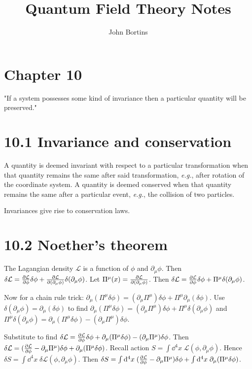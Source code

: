 \documentclass{article}
\title{Quantum Field Theory Notes}
\author{John Bortins}
\begin{document}
\maketitle{}

\section*{Chapter 10}
"If a system possesses some kind of invariance then a particular quantity will be preserved."

\section*{10.1 Invariance and conservation}
A quantity is deemed invariant with respect to a particular transformation when that quantity remains the same after said transformation, \emph{e.g.}, after rotation of the coordinate system. A quantity is deemed conserved when that quantity remains the same after a particular event, \emph{e.g.}, the collision of two particles.

Invariances give rise to conservation laws.

\section*{10.2 Noether's theorem}
The Lagangian density $\mathcal{L}$ is a function of $\phi$ and $\partial_\mu \phi$. Then $\delta\mathcal{L}=\pdv{\mathcal{L}}{\phi}\delta\phi+\pdv{\mathcal{L}}{(\partial_\mu \phi)}\delta(\partial_\mu \phi)$. Let $\Pi^\mu (x)=\pdv{\mathcal{L}}{(\partial_\mu \phi)}$. Then $\delta\mathcal{L}=\pdv{\mathcal{L}}{\phi}\delta\phi+\Pi^\mu \delta(\partial_\mu \phi)$.

Now for a chain rule trick: $\partial_\mu(\Pi^\mu \delta\phi)=(\partial_\mu \Pi^\mu)\delta\phi+\Pi^\mu \partial_\mu (\delta\phi)$. Use $\delta(\partial_\mu \phi)=\partial_\mu ( \delta\phi)$ to find $\partial_\mu(\Pi^\mu \delta\phi)=(\partial_\mu \Pi^\mu)\delta\phi+\Pi^\mu \delta(\partial_\mu \phi)$ and $\Pi^\mu \delta(\partial_\mu \phi)=\partial_\mu(\Pi^\mu \delta\phi)-(\partial_\mu \Pi^\mu)\delta\phi$.

Substitute to find $\delta\mathcal{L}=\pdv{\mathcal{L}}{\phi}\delta\phi+\partial_\mu(\Pi^\mu \delta\phi)-(\partial_\mu \Pi^\mu)\delta\phi$. Then $\delta\mathcal{L}=(\pdv{\mathcal{L}}{\phi}-\partial_\mu \Pi^\mu)\delta\phi+\partial_\mu(\Pi^\mu \delta\phi)$. Recall action $S=\int \dd^4 x\; \mathcal{L}(\phi,\partial_\mu \phi)$. Hence $\delta S=\int \dd^4 x\; \delta\mathcal{L}(\phi,\partial_\mu \phi)$. Then $\delta S=\int \dd^4 x\; (\pdv{\mathcal{L}}{\phi}-\partial_\mu \Pi^\mu)\delta\phi+\int \dd^4 x\; \partial_\mu(\Pi^\mu \delta\phi)$.
\end{document}
